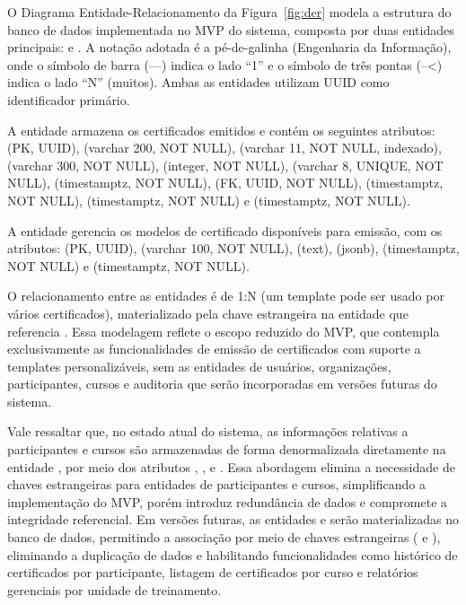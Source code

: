 O Diagrama Entidade-Relacionamento da Figura~\ref{fig:der} modela a estrutura do banco de dados implementada no MVP do sistema, composta por duas entidades principais:  e . A notação adotada é a pé-de-galinha (Engenharia da Informação), onde o símbolo de barra (---) indica o lado ``1'' e o símbolo de três pontas (--<) indica o lado ``N'' (muitos). Ambas as entidades utilizam UUID como identificador primário.

A entidade  armazena os certificados emitidos e contém os seguintes atributos:  (PK, UUID),  (varchar 200, NOT NULL),  (varchar 11, NOT NULL, indexado),  (varchar 300, NOT NULL),  (integer, NOT NULL),  (varchar 8, UNIQUE, NOT NULL),  (timestamptz, NOT NULL),  (FK, UUID, NOT NULL),  (timestamptz, NOT NULL),  (timestamptz, NOT NULL) e  (timestamptz, NOT NULL).

A entidade  gerencia os modelos de certificado disponíveis para emissão, com os atributos:  (PK, UUID),  (varchar 100, NOT NULL),  (text),  (jsonb),  (timestamptz, NOT NULL) e  (timestamptz, NOT NULL).

O relacionamento entre as entidades é de 1:N (um template pode ser usado por vários certificados), materializado pela chave estrangeira  na entidade  que referencia . Essa modelagem reflete o escopo reduzido do MVP, que contempla exclusivamente as funcionalidades de emissão de certificados com suporte a templates personalizáveis, sem as entidades de usuários, organizações, participantes, cursos e auditoria que serão incorporadas em versões futuras do sistema.

Vale ressaltar que, no estado atual do sistema, as informações relativas a participantes e cursos são armazenadas de forma denormalizada diretamente na entidade , por meio dos atributos , ,  e . Essa abordagem elimina a necessidade de chaves estrangeiras para entidades de participantes e cursos, simplificando a implementação do MVP, porém introduz redundância de dados e compromete a integridade referencial. Em versões futuras, as entidades  e  serão materializadas no banco de dados, permitindo a associação por meio de chaves estrangeiras ( e ), eliminando a duplicação de dados e habilitando funcionalidades como histórico de certificados por participante, listagem de certificados por curso e relatórios gerenciais por unidade de treinamento.

